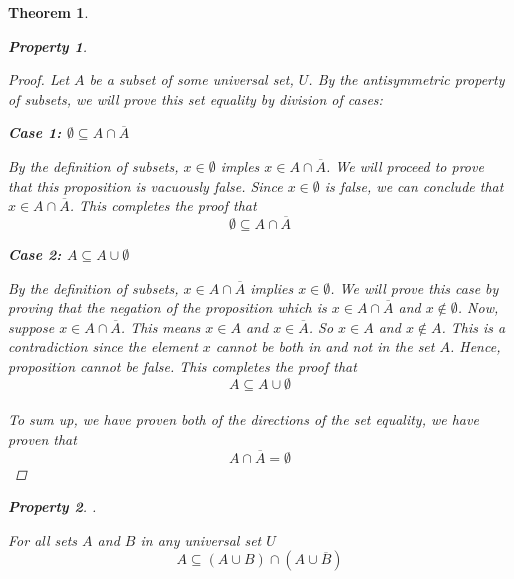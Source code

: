 \documentclass{book}
\newtheorem{theorem}{Theorem}[section]
\newtheorem{property}{Property}[theorem]
\theoremstyle{definition}
\theoremstyle{remark}
\begin{document}
\begin{theorem}
\begin{property}
        \begin{proof}
            Let $A$ be a subset of some universal set, $U$. By the antisymmetric property of subsets, we will prove this set equality by division of cases:
            
            \begin{flushleft} \textbf{Case 1: $\emptyset \subseteq A \cap \overline{A}$} \end{flushleft}
                By the definition of subsets, $x \in \emptyset$ imples $x \in A \cap \overline{A}$. We will proceed to prove that this proposition is vacuously false. Since $x \in \emptyset$ is false, we can conclude that $x \in A \cap \overline{A}$. This completes the proof that $$ \emptyset \subseteq A \cap \overline{A} $$
    
            
            \begin{flushleft} \textbf{Case 2: $A \subseteq A \cup \emptyset$} \end{flushleft} 
                By the definition of subsets, $x \in A \cap \overline{A}$ implies $x \in \emptyset$. We will prove this case by proving that the negation of the proposition which is $x \in A \cap \overline{A}$ and $x \notin \emptyset$. Now, suppose $x \in A \cap \overline{A}$. This means $x \in A$ and $x \in \overline{A}$. So $x \in A$ and $x \notin A$. This is a contradiction since the element $x$ cannot be both in and not in the set $A$. Hence, proposition cannot be false. This completes the proof that $$ A \subseteq A \cup \emptyset $$ \\
            To sum up, we have proven both of the directions of the set equality, we have proven that $$A \cap \overline{A} = \emptyset$$ 
        \end{proof}
    \end{property}
    
    
    
    \newpage
    \begin{property}
    . \\
    
        \begin{tcolorbox}
            For all sets $A$ and $B$ in any universal set $U$ \\
                \begin{equation*}
                    A \subseteq (A \cup B) \cap (A \cup \overline{B})
                \end{equation*}
        \end{tcolorbox}
        

\end{property}
\end{theorem}
\end{document}
